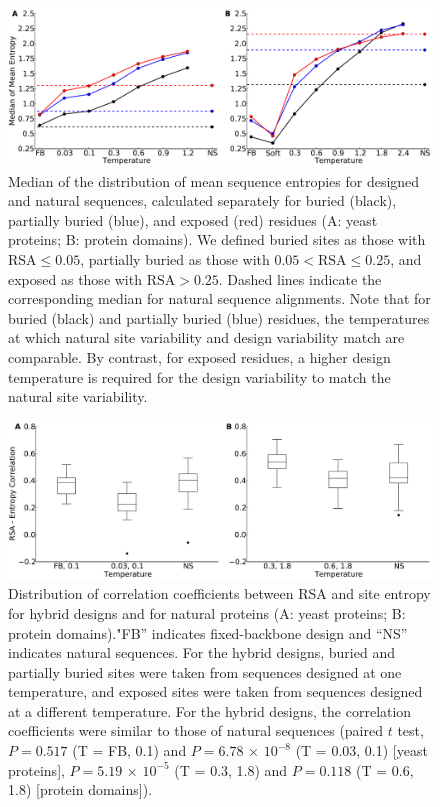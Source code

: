 \documentclass[12pt]{article}
\begin{document}
\begin{figure}[H]
\centerline{\includegraphics[width = 6in]{figures/Mean_Entropy_Position_Lineplot_Combo.pdf}}
\caption{Median of the distribution of mean sequence entropies for designed and natural sequences, calculated separately for buried (black), partially buried (blue), and exposed (red) residues (A: yeast proteins; B: protein domains). We defined buried sites as those with $\text{RSA}\leq 0.05$, partially buried as those with $0.05<\text{RSA}\leq0.25$, and exposed as those with $\text{RSA}>0.25$. Dashed lines indicate the corresponding median for natural sequence alignments. Note that for buried (black) and partially buried (blue) residues, the temperatures at which natural site variability and design variability match are comparable. By contrast, for exposed residues, a higher design temperature is required for the design variability to match the natural site variability.}
\label{Mean_Entropy_Surface_Core}
\end{figure}


\begin{figure}[H]
\centerline{\includegraphics[width = 6in]{figures/Combo_Mixed_Temp_Correlation_Plot.pdf}}
\caption{Distribution of correlation coefficients between RSA and site entropy for hybrid designs and for natural proteins (A: yeast proteins; B: protein domains)."FB'' indicates fixed-backbone design and ``NS'' indicates natural sequences. For the hybrid designs, buried and partially buried sites were taken from sequences designed at one temperature, and exposed sites were taken from sequences designed at a different temperature. For the hybrid designs, the correlation coefficients were similar to those of natural sequences (paired $t$ test,  $P=0.517$ (T = FB, 0.1)  and  $P= 6.78 $ $\times$ $10^{-8}$ (T = 0.03, 0.1) [yeast proteins], $P= 5.19$  $\times$ $10^{-5}$ (T = 0.3, 1.8) and $P= 0.118$ (T = 0.6, 1.8)  [protein domains]).}
\label{Mixed_RSA_Entropy}
\end{figure}
\end{document}
